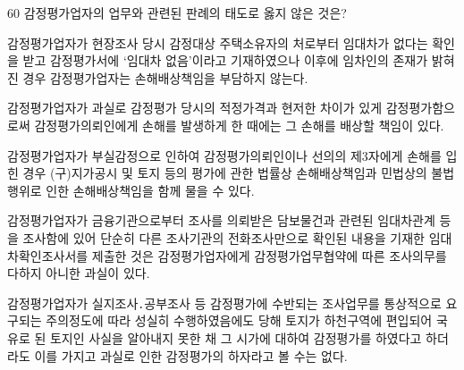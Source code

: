 \begin{question}{60}
감정평가업자의 업무와 관련된 판례의 태도로 옳지 않은 것은?
\begin{choices}
  \item 감정평가업자가 현장조사 당시 감정대상 주택소유자의 처로부터 임대차가 없다는 확인을 받고 감정평가서에 ‘임대차 없음’이라고 기재하였으나 이후에 임차인의 존재가 밝혀진 경우 감정평가업자는 손해배상책임을 부담하지 않는다.
  \item 감정평가업자가 과실로 감정평가 당시의 적정가격과 현저한 차이가 있게 감정평가함으로써 감정평가의뢰인에게 손해를 발생하게 한 때에는 그 손해를 배상할 책임이 있다.
  \item 감정평가업자가 부실감정으로 인하여 감정평가의뢰인이나 선의의 제3자에게 손해를 입힌 경우 (구)지가공시 및 토지 등의 평가에 관한 법률상 손해배상책임과 민법상의 불법행위로 인한 손해배상책임을 함께 물을 수 있다.
  \item 감정평가업자가 금융기관으로부터 조사를 의뢰받은 담보물건과 관련된 임대차관계 등을 조사함에 있어 단순히 다른 조사기관의 전화조사만으로 확인된 내용을 기재한 임대차확인조사서를 제출한 것은 감정평가업자에게 감정평가업무협약에 따른 조사의무를 다하지 아니한 과실이 있다.
  \item 감정평가업자가 실지조사․공부조사 등 감정평가에 수반되는 조사업무를 통상적으로 요구되는 주의정도에 따라 성실히 수행하였음에도 당해 토지가 하천구역에 편입되어 국유로 된 토지인 사실을 알아내지 못한 채 그 시가에 대하여 감정평가를 하였다고 하더라도 이를 가지고 과실로 인한 감정평가의 하자라고 볼 수는 없다.
\end{choices}
\end{question}

